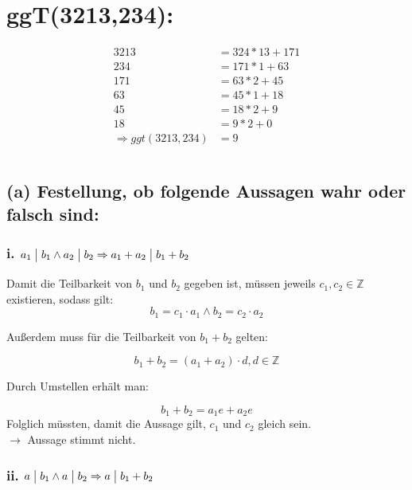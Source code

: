 \documentclass[11pt,a4paper]{article}
\begin{document}
\section{ggT(3213,234):} %
\begin{align*}
3213 &= 324 * 13 + 171\\
234 &= 171 * 1 + 63\\
171 &= 63 * 2 + 45\\
63 &= 45 * 1 + 18\\
45 &= 18 * 2 + 9\\
18 &= 9 * 2 + 0\\
\Rightarrow ggt(3213,234) &= 9
\end{align*}

\section{} %

\subsection*{(a) Festellung, ob folgende Aussagen wahr oder falsch sind:}

\subsubsection*{i. $a_1 \bigm| b_1 \wedge a_2 \bigm| b_2 \Rightarrow a_1 + a_2 \bigm| b_1 + b_2$}

Damit die Teilbarkeit von $b_1$ und $b_2$ gegeben ist, müssen jeweils $c_1, c_2 \in \mathbb{Z}$ existieren, sodass gilt:
\begin{equation*}
b_1 = c_1 \cdot a_1 \wedge b_2 = c_2 \cdot a_2
\end{equation*}

Außerdem muss für die Teilbarkeit von $b_1 + b_2$ gelten:

\begin{equation*}
b_1 + b_2 = (a_1 + a_2) \cdot d, d \in \mathbb{Z}
\end{equation*}

Durch Umstellen erhält man:

\begin{equation*}
b_1 + b_2 = a_1e + a_2e
\end{equation*}
Folglich müssten, damit die Aussage gilt, $c_1$ und $c_2$ gleich sein.\\
$\rightarrow$ Aussage stimmt nicht.

\subsubsection*{ii. $a \bigm| b_1 \wedge a \bigm| b_2 \Rightarrow a \bigm| b_1 + b_2$}
\end{document}
